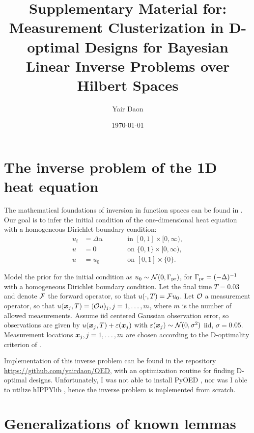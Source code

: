 \documentclass{siamonline220329}
\title{Supplementary Material for: Measurement Clusterization in
  D-optimal Designs for Bayesian Linear Inverse Problems over Hilbert
  Spaces}
\author{Yair Daon}
\date{\today}
\begin{document}
\maketitle


\section{The inverse problem of the 1D heat equation}\label{section:example}
The mathematical foundations of inversion in function spaces can be
found in \cite{Stuart10}. Our goal is to infer the initial condition of
the one-dimensional heat equation with a homogeneous Dirichlet
boundary condition:
\begin{subequations}\label{eq:heat equation}
  \begin{alignat}{2}
    u_t &= \Delta u &&\qquad \text{in } [0,1] \times [0,\infty),\\
      u &= 0 &&\qquad \text{on } \{0, 1\} \times [0,\infty),\\
        u &= u_0 &&\qquad \text{on }[0,1] \times \{0\}.
  \end{alignat}
\end{subequations}

Model the prior for the initial condition as $u_0 \sim
\mathcal{N}(0,\Gamma_{\textup{pr}})$, for $\Gamma_{\textup{pr}} = (-\Delta)^{-1}$ with a homogeneous
Dirichlet boundary condition. Let the final time $T = 0.03$ and denote
$\mathcal{F}$ the forward operator, so that $u(\cdot, T) = \mathcal{F} u_0$. Let
$\mathcal{O}$ a measurement operator, so that $u({\boldsymbol{x}}_j,T) = (\mathcal{O} u)_j,
j=1,\dots,m$, where $m$ is the number of allowed measurements. Assume
iid centered Gaussian observation error, so observations are given by
$u({\boldsymbol{x}}_j,T) + \varepsilon({\boldsymbol{x}}_j)$ with $\varepsilon({\boldsymbol{x}}_j) \sim \mathcal{N}(0, \sigma^2)$
iid, $\sigma = 0.05$. Measurement locations ${\boldsymbol{x}}_j,j=1,\dots,m$ are
chosen according to the D-optimality criterion of
\cite{AlexanderianGloorGhattas14}.

Implementation of this inverse problem can be found in the
repository \url{https://github.com/yairdaon/OED}, with an optimization
routine for finding D-optimal designs. Unfortunately, I was not able
to install PyOED \cite{attia2023pyoed}, nor was I able to utilize
hIPPYlib \cite{VillaPetraGhattas16, VillaPetraGhattas18,
VillaPetraGhattas21}, hence the inverse problem is implemented from
scratch.

\section{Generalizations of known lemmas}
\end{document}

